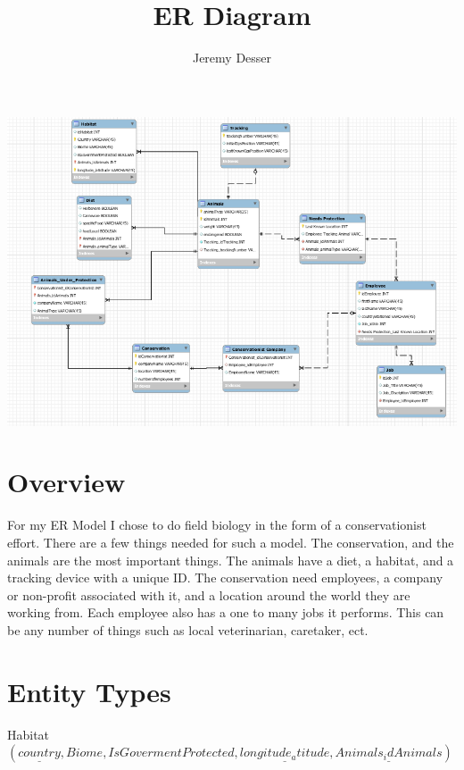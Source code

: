 \documentclass[11pt]{article}
\theoremstyle{plain}
\theoremstyle{definition}
\begin{document}
 


\title{ER Diagram}
\author{Jeremy Desser}
\begin{titlepage}
\maketitle
\end{titlepage}


\section{}
\includegraphics[scale=.9]{ErDiagram}
\section{Overview}
For my ER Model I chose to do field biology in the form of a conservationist effort. There are a few things needed for such a model. The conservation, and the animals are the most important things. The animals have a diet, a habitat, and a tracking device with a unique ID. The conservation need employees, a company or non-profit associated with it, and a location around the world they are working from. Each employee also has a one to many jobs it performs. This can be any number of things such as local veterinarian, caretaker, ect. 


\section{Entity Types}
Habitat$(\underline{country }, Biome, IsGovermentProtected,\underline{ longitude_atitude},\underline{ Animals_idAnimals})$ \\
\end{document}
